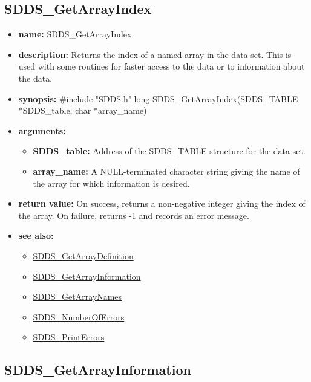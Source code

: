\documentclass[11pt]{article}
\newcommand{\progref}[1]{\hyperref{SDDS_#1}{{\tt SDDS\_#1} (}{)}{SDDS_#1}}
\begin{document}
\subsection{SDDS\_GetArrayIndex}
\label{SDDS_GetArrayIndex}

\begin{itemize}
\item {\bf name:}\newline
SDDS\_GetArrayIndex
\item {\bf description:}\newline
Returns the index of a named array in the data set. This is used with some routines for faster access to the data or to information about the data.
\item {\bf synopsis:} \#include "SDDS.h"\newline
long SDDS\_GetArrayIndex(SDDS\_TABLE *SDDS\_table, char *array\_name)
\item {\bf arguments:}
\begin{itemize}
\item {\bf SDDS\_table:} Address of the SDDS\_TABLE structure for the data set.
\item {\bf array\_name:} A NULL-terminated character string giving the name of the array for which information is desired.
\end{itemize}
\item {\bf return value:}\newline
On success, returns a non-negative integer giving the index of the array. On failure, returns -1 and records an error message.
\item {\bf see also:}
\begin{itemize}
\item \progref{GetArrayDefinition}
\item \progref{GetArrayInformation}
\item \progref{GetArrayNames}
\item \progref{NumberOfErrors}
\item \progref{PrintErrors}
\end{itemize}
\end{itemize}

\subsection{SDDS\_GetArrayInformation}
\label{SDDS_GetArrayInformation}
\end{document}
